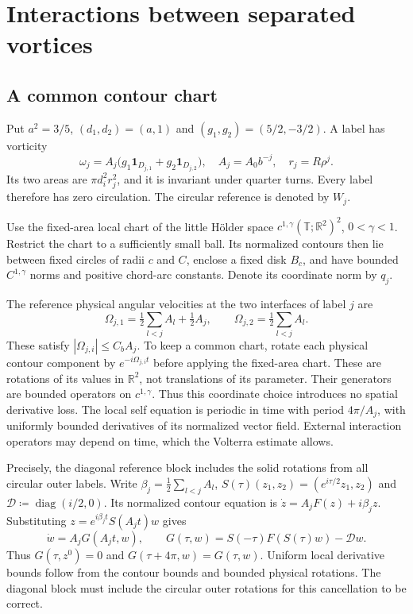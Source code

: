 \documentclass[11pt]{amsart}
\theoremstyle{remark}
\numberwithin{equation}{section}
\begin{document}
\section{Interactions between separated vortices}\label{part:ib}
\subsection{A common contour chart}
Put $a^2=3/5$, $(d_1,d_2)=(a,1)$ and $(g_1,g_2)=(5/2,-3/2)$. A label has vorticity
\[
 \omega_j=A_j\bigl(g_1\mathbf1_{D_{j,1}}+g_2\mathbf1_{D_{j,2}}\bigr),
 \quad A_j=A_0b^{-j},\quad r_j=R\rho^j.
\]
Its two areas are $\pi d_i^2r_j^2$, and it is invariant under quarter turns. Every label therefore has zero circulation. The circular reference is denoted by $W_j$.

Use the fixed-area local chart of the little H\"older space $c^{1,\gamma}(\mathbb T;\mathbb R^2)^2$, $0<\gamma<1$. Restrict the chart to a sufficiently small ball. Its normalized contours then lie between fixed circles of radii $c$ and $C$, enclose a fixed disk $B_c$, and have bounded $C^{1,\gamma}$ norms and positive chord-arc constants. Denote its coordinate norm by $q_j$.

The reference physical angular velocities at the two interfaces of label $j$ are
\[
 \Omega_{j,1}=\tfrac12\sum_{l<j}A_l+\tfrac12A_j,
 \qquad \Omega_{j,2}=\tfrac12\sum_{l<j}A_l.
\]
These satisfy $|\Omega_{j,i}|\le C_bA_j$. To keep a common chart, rotate each physical contour component by $e^{-i\Omega_{j,i}t}$ before applying the fixed-area chart. These are rotations of its values in $\mathbb R^2$, not translations of its parameter. Their generators are bounded operators on $c^{1,\gamma}$. Thus this coordinate choice introduces no spatial derivative loss. The local self equation is periodic in time with period $4\pi/A_j$, with uniformly bounded derivatives of its normalized vector field. External interaction operators may depend on time, which the Volterra estimate allows.

Precisely, the diagonal reference block includes the solid rotations from all circular outer labels. Write $\beta_j=\frac12\sum_{l<j}A_l$, $S(\tau)(z_1,z_2)=(e^{i\tau/2}z_1,z_2)$ and $\mathcal D\coloneqq\operatorname{diag}(i/2,0)$. Its normalized contour equation is $\dot z=A_jF(z)+i\beta_jz$. Substituting $z=e^{i\beta_jt}S(A_jt)w$ gives
\[
 \dot w=A_jG(A_jt,w),\qquad
 G(\tau,w)=S(-\tau)F(S(\tau)w)-\mathcal D w.
\]
Thus $G(\tau,z^0)=0$ and $G(\tau+4\pi,w)=G(\tau,w)$. Uniform local derivative bounds follow from the contour bounds and bounded physical rotations. The diagonal block must include the circular outer rotations for this cancellation to be correct.
\end{document}
